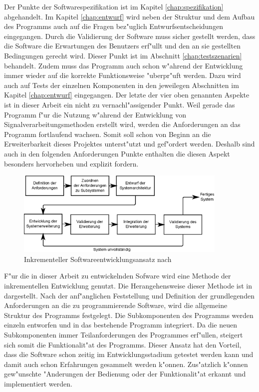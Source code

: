 Der Punkte der Softwarespezifikation ist im Kapitel \ref{chap:spezifikation} abgehandelt.
Im Kapitel \ref{chap:entwurf} wird neben der Struktur und dem Aufbau des Programms auch auf die Fragen bez"uglich Entwurfsentscheidungen eingegangen.
Durch die Validierung der Software muss sicher gestellt werden, dass die Software die Erwartungen des Benutzers erf"ullt und den an sie gestellten Bedingungen gerecht wird.
Dieser Punkt ist im Abschnitt \ref{chap:testszenarien} behandelt.
Zudem muss das Programm auch schon w"ahrend der Entwicklung immer wieder auf die korrekte Funktionsweise "uberpr"uft werden.
Dazu wird auch auf Tests der einzelnen Komponenten in den jeweilegen Abschnitten im Kapitel \ref{chap:entwurf} eingegangen.
Der letzte der vier oben genannten Aspekte ist in dieser Arbeit ein nicht zu vernachl"assigender Punkt.
Weil gerade das Programm f"ur die Nutzung w"ahrend der Entwicklung von Signalverarbeitungsmethoden erstellt wird, werden die Anforderungen an das Programm fortlaufend wachsen.
Somit soll schon von Beginn an die Erweiterbarkeit dieses Projektes unterst"utzt und gef"ordert werden.
Deshalb sind auch in den folgenden Anforderungen Punkte enthalten die diesen Aspekt besonders hervorheben und explizit fordern.

\begin{figure}[b]
\centering
\includegraphics[width=0.9\textwidth]{bilder/inkrementelle_entwicklung.eps}
\caption{Inkrementeller Softwareentwicklungsansatz nach \cite{Sommerville2001a}}
\label{pic:inkrementelle_entwicklung}
\end{figure}
F"ur die in dieser Arbeit zu entwickelnden Sofware wird eine Methode der inkrementellen Entwicklung genutzt.
Die Herangehensweise dieser Methode ist in  dargestellt.
Nach der anf"anglichen Feststellung und Definition der grundlegenden Anforderungen an die zu programmierende Software, wird die allgemeine Struktur des Programms festgelegt.
Die Subkomponenten des Programms werden einzeln entworfen und in das bestehende Programm integriert.
Da die neuen Subkomponenten immer Teilanforderungen des Programmes erf"ullen, steigert sich somit die Funktionalit"at des Programms.
Dieser Ansatz hat den Vorteil, dass die Software schon zeitig im Entwicklungsstadium getestet werden kann und damit auch schon Erfahrungen gesammelt werden k"onnen.
Zus"atzlich k"onnen gew"unschte "Anderungen der Bedienung oder der Funktionalit"at erkannt und implementiert werden.

